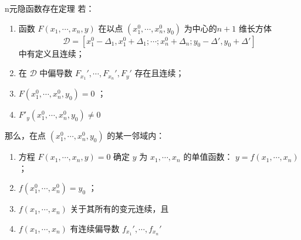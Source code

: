 \begin{theorem}{n元隐函数存在定理}\label{Mulmp_the1}
若：\begin{enumerate}
\item 函数 $F(x_1,\cdots,x_n,y)$ 在以点 $(x_1^0,\cdots,x_n^0,y_0)$ 为中心的$n+1$ 维长方体
\begin{equation}
\mathcal{D}=[x_1^0-\Delta_1,x_1^0+\Delta_1;\cdots;x_n^0+\Delta_n;y_0-\Delta',y_0+\Delta']
\end{equation}
中有定义且连续；
\item 在 $\mathcal{D}$ 中偏导数 $F_{x_1}',\cdots,F_{x_n}',F_y'$ 存在且连续；
\item $F(x_1^0,\cdots,x_n^0,y_0)=0$ ；
\item $F'_y(x_1^0,\cdots,x_n^0,y_0)\neq 0$
\end{enumerate}
那么，在点 $(x_1^0,\cdots,x_n^0,y_0)$ 的某一邻域内：
\begin{enumerate}
\item 方程 $F(x_1,\cdots,x_n,y)=0$ 确定 $y$ 为 $x_1,\cdots,x_n$ 的单值函数： $y=f(x_1,\cdots,x_n)$；
\item $f(x_1^0,\cdots,x_n^0)=y_0$ ；
\item $f(x_1,\cdots,x_n)$ 关于其所有的变元连续，且
\item $f(x_1,\cdots,x_n)$ 有连续偏导数 $f_{x_1}',\cdots,f_{x_n}'$
\end{enumerate}
\end{theorem}

